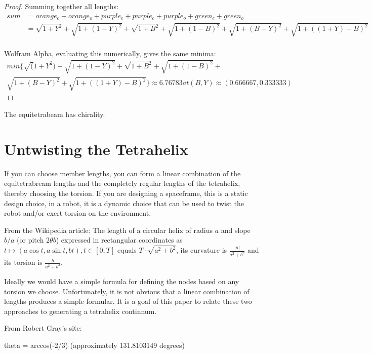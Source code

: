 \documentclass[11pt]{article}
\begin{document}
\begin{proof}
  Summing together all lengths:
  \begin{align*}
  sum &= orange_e + orange_o + purple_e + purple_e + purple_o + green_e + green_o \\    
  &= \sqrt{1 + Y^2} + \sqrt{1 + (1-Y)^2} + \sqrt{1 + B^2} + \sqrt{1+ (1-B)^2} +  \sqrt{1 + (B - Y)^2} +  \sqrt{1 + ((1+Y) - B)^2} \\
  \end{align*} 

  Wolfram Alpha, evaluating this numerically, gives the same minima:
\begin{align*}
  min\{\sqrt(1 + Y^2) + \sqrt{1 + (1 - Y)^2} + \sqrt{1 + B^2} + \sqrt{1 + (1 - B)^2} + \\
    \sqrt{1 + (B - Y)^2} + \sqrt{1 + ((1 + Y) - B)^2}\} \approx 6.76783 at (B, Y) \approx (0.666667, 0.333333)
\end{align*}
  
\end{proof}

The equitetrabeam has chirality.

\section{Untwisting the Tetrahelix}

If you can choose member lengths, you can form a linear combination of the equitetrabream lengths and the completely regular
lengths of the tetrahelix, thereby choosing the torsion.  If you are designing a spaceframe, this is a static design choice,
in a robot, it is a dynamic choice that can be used to twist the robot and/or exert torsion on the environment.

From the Wikipedia article:
The length of a circular helix of radius $a$ and slope $b/a$ (or pitch $2θ b$) expressed in rectangular coordinates as
$ t\mapsto (a\cos t, a\sin t, bt), t\in [0,T] $
equals
$ T\cdot {\sqrt {a^{2}+b^{2}}} $, its curvature is $ \frac {|a|}{a^{2}+b^{2}} $
and its torsion is $ \frac {b}{a^{2}+b^{2}}  $.

Ideally we would have a simple formula for defining the nodes based on any torsion we choose.
Unfortunately, it is not obvious that a linear combination of lengths produces a simple formular.
It is a goal of this paper to relate these two approaches to generating a tetrahelix continnum.

From Robert Gray's site:

theta = arccos(-2/3) (approximately 131.8103149 degrees)
\end{document}
